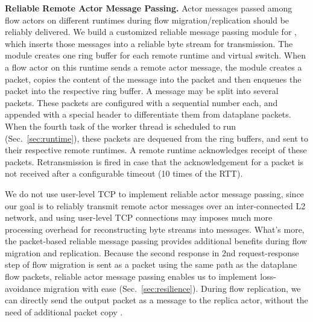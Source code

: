 




\vspace{1mm}
\noindent \textbf{Reliable Remote Actor Message Passing.}
Actor messages passed among flow actors on different runtimes during flow migration/replication should be reliably delivered. We build a customized reliable message passing module for \nfactor, which inserts those messages into a reliable byte stream for transmission. %
The module creates one ring buffer for each remote runtime and virtual switch. When a flow actor on this runtime sends a remote actor message, the module creates a packet, copies the content of the message into the packet and then enqueues the packet into the respective ring buffer. A message may be split into several packets. %
These packets are configured with a sequential number each, and appended with a special header to differentiate them from dataplane packets.
 When the fourth task of the worker thread is scheduled to run (Sec.~\ref{sec:runtime}), these packets are dequeued from the ring buffers, and sent to their respective remote runtimes. A remote runtime acknowledges receipt of these packets. Retransmission is fired in case that the acknowledgement for a packet is not received after a configurable timeout (10 times of the RTT).

We do not use user-level TCP \cite{mtcp} to implement reliable actor message passing, since our goal is to reliably transmit remote actor messages over an inter-connected L2 network, and using user-level TCP connections may imposes much more processing overhead for reconstructing byte streams into messages.
What's more, the packet-based reliable message passing provides additional benefits during flow migration and replication. Because the second response in 2nd request-response step of flow migration is sent as a packet using the same path as the dataplane flow packets, reliable actor message passing enables us to implement loss-avoidance migration with ease (Sec.~\ref{sec:resilience}). During flow replication, we can directly send the output packet as a message to the replica actor, without the need of additional packet copy .

